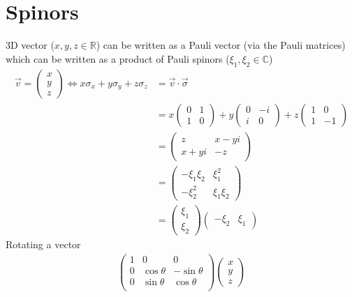 \documentclass[../main.tex]{subfiles}
\begin{document}
\section{Spinors}
3D vector ($x,y,z\in\mathbb{R}$) can be written as a Pauli vector (via the Pauli matrices) which can be written as a product of Pauli spinors ($\xi_1,\xi_2\in\mathbb{C}$) 
\begin{align}
\vec{v}=
\left(
\begin{matrix}
x\\
y\\
z
\end{matrix}
\right)
\Longleftrightarrow
x\sigma_x+y\sigma_y+z\sigma_z
&=\vec{v}\cdot\vec{\sigma}\\
&=x\left(
\begin{matrix}
0    & 1\\
1 &  0
\end{matrix}
\right)+
y\left(
\begin{matrix}
0    & -i\\
i &  0
\end{matrix}
\right)+
z\left(
\begin{matrix}
1 & 0\\
1 &  -1
\end{matrix}
\right)\\
&=\left(
\begin{matrix}
z    & x-yi\\
x+yi &  -z
\end{matrix}
\right)\\
&=\left(
\begin{matrix}
-\xi_1\xi_2 & \xi_1^2\\
-\xi_2^2    & \xi_1\xi_2
\end{matrix}
\right)\\
&=\left(
\begin{matrix}
\xi_1 \\
\xi_2 
\end{matrix}
\right)
\left(
\begin{matrix}
-\xi_2&\xi_1 
\end{matrix}
\right)
\end{align}
Rotating a vector
\begin{align}
\left(
\begin{matrix}
1 & 0 & 0\\
0 & \cos\theta & -\sin\theta\\
0 & \sin\theta & \cos\theta\\
\end{matrix}
\right)\left(
\begin{matrix}
x\\
y\\
z
\end{matrix}
\right)
\end{align}
\end{document}
